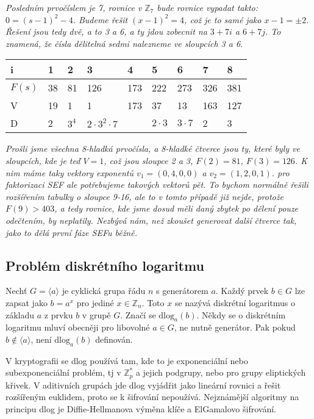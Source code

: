 \documentclass[10pt,a4paper]{article}
\begin{document}
\textit{Posledním prvočíslem je 7, rovnice v $\mathbb{Z}_7$ bude rovnice vypadat takto: $0 = (s - 1)^2 - 4$. Budeme řešit $(x-1)^2 = 4$, což je to samé jako $x-1 = \pm 2$. Řešení jsou tedy dvě, a to 3 a 6, a ty jdou zobecnit na $3 + 7i$ a $6 + 7j$.  To znamená, že čísla dělitelná sedmi nalezneme ve sloupcích 3 a 6.}

\begin{table}[h!]
\centering
\begin{tabular}{|p{1cm}|p{1cm}|p{1cm}|p{1cm}|p{1cm}|p{1cm}|p{1cm}|p{1cm}|p{1cm}|}
\hline
i & 1 & 2 &\textbf{3} & 4 & 5 & \textbf{6} & 7 & 8\\
\hline
\hline
$F(s)$ & 38 & 81 & 126 & 173 & 222 & 273 & 326 & 381\\
\hline
V & 19 & 1 & 1 & 173 & 37 & 13 & 163 & 127\\
\hline
D & 2  & $3^4$ & $2\cdot 3^2 \cdot 7$  &         & $2\cdot 3$   &   $3 \cdot 7$   &  2    &  3 \\
\hline
\end{tabular}
\end{table}

\textit{Prošli jsme všechna 8-hladká prvočísla, a 8-hladké čtverce jsou ty, které byly ve sloupcích, kde je teď $V = 1$, což jsou sloupce 2 a 3, $F(2) = 81$, $F(3) = 126$. K nim máme taky vektory exponentů $v_1 = (0, 4, 0, 0)$ a $v_2 = (1, 2, 0, 1)$. pro faktorizaci SEF ale potřebujeme takových vektorů pět. To bychom normálně řešili rozšířením tabulky o sloupce 9-16, ale to v tomto případě již nejde, protože $F(9) > 403$, a tedy rovnice, kde jsme dosud měli daný zbytek po dělení pouze odečtením, by neplatily. Nezbývá nám, než zkoušet generovat další čtverce tak, jako to dělá první fáze SEFu běžně.}

\subsection{Problém diskrétního logaritmu}
Nechť $G = \langle a \rangle$ je cyklická grupa řádu $n$ s generátorem $a$. Každý prvek $b \in G$ lze zapsat jako $b = a^x$ pro jediné $x \in \mathbb{Z}_n$. Toto $x$ se nazývá diskrétní logaritmus o základu $a$ z prvku $b$ v grupě $G$. Značí se $\text{dlog}_a (b)$. Někdy se o diskrétním logaritmu mluví obecněji pro libovolné $a \in G$, ne nutně generátor. Pak pokud $b \notin \langle a \rangle$, není $\text{dlog}_a (b)$ definován.

V kryptografii se dlog používá tam, kde to je exponenciální nebo subexponenciální problém, tj v $\mathbb{Z}_p^*$ a jejich podgrupy, nebo pro grupy eliptických křivek. V aditivních grupách jde dlog vyjádřit jako lineární rovnici a řešit rozšířeným euklidem, proto se k šifrování nepoužívá. Nejznámější algoritmy na principu dlog je Diffie-Hellmanova výměna klíče a ElGamalovo šifrování.
\end{document}

